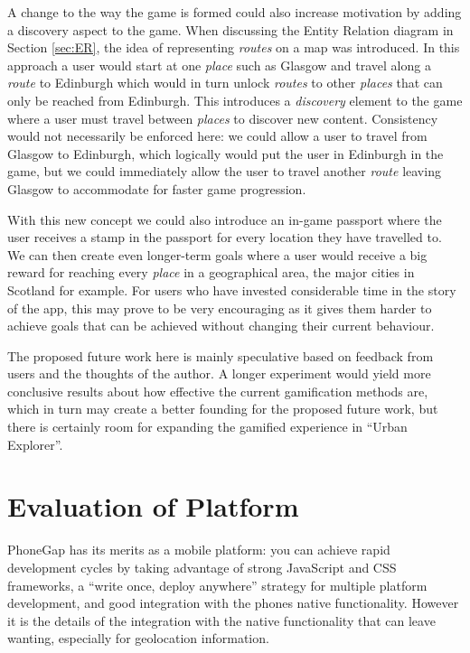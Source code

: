 A change to the way the game is formed could also increase motivation
by adding a discovery aspect to the game. When discussing the Entity
Relation diagram in Section \ref{sec:ER}, the idea of representing
\emph{routes} on a map was introduced. In this approach a user would
start at one \emph{place} such as Glasgow and travel along a
\emph{route} to Edinburgh which would in turn unlock \emph{routes} to
other \emph{places} that can only be reached from Edinburgh. This
introduces a \emph{discovery} element to the game where a user must
travel between \emph{places} to discover new content. Consistency
would not necessarily be enforced here: we could allow a user to
travel from Glasgow to Edinburgh, which logically would put the user
in Edinburgh in the game, but we could immediately allow the user to
travel another \emph{route} leaving Glasgow to accommodate for faster
game progression.

With this new concept we could also introduce an in-game passport
where the user receives a stamp in the passport for every location
they have travelled to. We can then create even longer-term goals
where a user would receive a big reward for reaching every
\emph{place} in a geographical area, the major cities in Scotland for
example. For users who have invested considerable time in the story of
the app, this may prove to be very encouraging as it gives them harder
to achieve goals that can be achieved without changing their current
behaviour. 

The proposed future work here is mainly speculative based on feedback
from users and the thoughts of the author. A longer experiment would
yield more conclusive results about how effective the current
gamification methods are, which in turn may create a better founding
for the proposed future work, but there is certainly room for
expanding the gamified experience in ``Urban Explorer''.


\section{Evaluation of Platform}
PhoneGap has its merits as a mobile platform: you can achieve rapid
development cycles by taking advantage of strong JavaScript and CSS
frameworks, a ``write once, deploy anywhere'' strategy for multiple
platform development, and good integration with the phones native
functionality. However it is the details of the integration with the
native functionality that can leave wanting, especially for
geolocation information.

